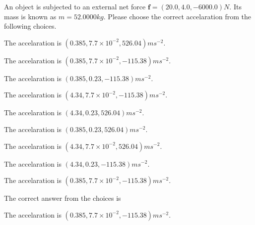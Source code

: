 \documentclass[12pt]{article}
\begin{document}
 
 
An object is subjected to an external net force $\mathbf{f}=
(20.0 , 4.0 , -6000.0) N$.
Its mass is known as $m= %
52.0000 kg$. Please choose the
correct accelaration from the following choices.
 
 
 
The accelaration is $  %
(
0.385,
7.7 \times 10^{-2},
526.04)
ms^{-2} $.
 
 
The accelaration is $  %
(
0.385,
7.7 \times 10^{-2},
-115.38)
ms^{-2} $.
 
 
The accelaration is $  %
(
0.385,
0.23,
-115.38)
ms^{-2} $.
 
 
The accelaration is $  %
(
4.34,
7.7 \times 10^{-2},
-115.38)
ms^{-2} $.
 
 
The accelaration is $  %
(
4.34,
0.23,
526.04)
ms^{-2} $.
 
 
The accelaration is $  %
(
0.385,
0.23,
526.04)
ms^{-2} $.
 
 
The accelaration is $  %
(
4.34,
7.7 \times 10^{-2},
526.04)
ms^{-2} $.
 
 
The accelaration is $  %
(
4.34,
0.23,
-115.38)
ms^{-2} $.
 
 
\noindent{}
 
 
The accelaration is $  %
(
0.385,
7.7 \times 10^{-2},
-115.38)
ms^{-2} $.
 
 
\noindent{}
 
 
 
 
 
\noindent{}
 
 

The correct answer from the choices is


The accelaration is $  %
(
0.385,
7.7 \times 10^{-2},
-115.38)
ms^{-2} $.
 
 
 
\noindent{}
 
 

 
 
\end{document}
